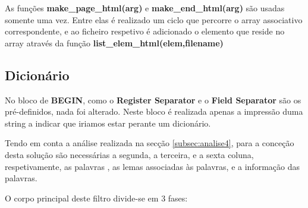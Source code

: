 \documentclass[11pt,a4paper]{report}
\begin{document}
As funções \textbf{make\_page\_html(arg)} e \textbf{make\_end\_html(arg)} são usadas somente uma vez. Entre elas é realizado um ciclo que percorre o array associativo correspondente, e ao ficheiro respetivo é adicionado o elemento que reside no array através da função \textbf{list\_elem\_html(elem,filename)}

\newpage

\subsection{Dicionário}
\label{subsec:algoritmos4}

No bloco de \textbf{BEGIN}, como o \textbf{Register Separator} e o \textbf{Field Separator} são os pré-definidos, nada foi alterado. Neste bloco é realizada apenas a impressão duma string a indicar que iriamos estar perante um dicionário.

Tendo em conta a análise realizada na secção \ref{subsec:analise4}, para a conceção desta solução são necessárias a segunda, a terceira, e a sexta coluna, respetivamente, as palavras , as lemas associadas às palavras, e a informação das palavras.

O corpo principal deste filtro divide-se em 3 fases:
\end{document}
